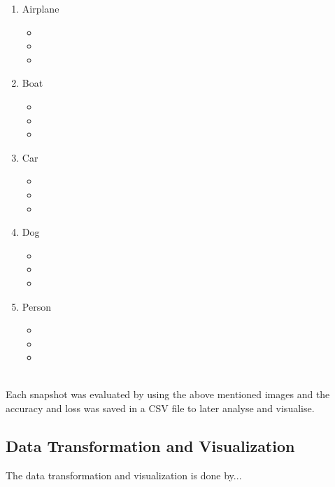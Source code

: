 \begin{enumerate}
    \item Airplane
        \begin{itemize}
            \item {}
            \item {}
            \item {}
        \end{itemize}
    \item Boat
        \begin{itemize}
            \item {}
            \item {}
            \item {}
        \end{itemize}
    \item Car
        \begin{itemize}
            \item {}
            \item {}
            \item {}
        \end{itemize}
    \item Dog
        \begin{itemize}
            \item {}
            \item {}
            \item {}
        \end{itemize}
    \item Person
        \begin{itemize}
            \item {}
            \item {}
            \item {}
        \end{itemize}
\end{enumerate}
\\
Each snapshot was evaluated by using the above mentioned images and the accuracy and loss was saved in a CSV file to later 
analyse and visualise.

\subsection{Data Transformation and Visualization}
The data transformation and visualization is done by...

